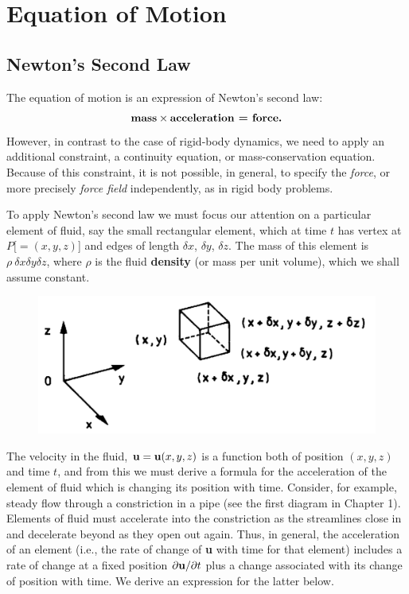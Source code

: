 \documentclass[twoside,a4paper,11pt]{report}
\begin{document}
\cleardoublepage

\chapter{Equation of Motion}
\section{Newton's Second Law}
The equation of motion is an expression of Newton's second law:
\[
\hbox{\textbf{mass}}\times \hbox{\textbf{acceleration = force.}}
\]
However, in contrast to the case of rigid-body dynamics, we need to apply an 
additional constraint, a continuity equation, or mass-conservation equation. 
Because of this constraint, it is not possible, in general, to specify the 
\textit{force}, or more precisely \textit{force field} independently, as in rigid body problems. 

To apply Newton's second law we must focus our attention on a particular 
element of fluid, say the small rectangular element, which at time $t$ has 
vertex at $P [=(x,y,z)$] and edges of length $\delta x$, $\delta y$, $\delta 
z$. The mass of this element is $\rho\ \delta x \delta y\delta z$, 
where $\rho $ is the fluid \textbf{density} (or mass per unit volume), which 
we shall assume constant.

\begin{figure}[htbp]
\centerline{\includegraphics[width=4.5in]{Section21.pdf}}
\label{fig1}
\end{figure}

The velocity in the fluid, ${\bf u} = {\bf u}(x,y,z)$ is a function both of 
position $(x,y,z)$ and time $t$, and from this we must derive a formula for the 
acceleration of the element of fluid which is changing its position with 
time. Consider, for example, steady flow through a constriction in a pipe 
(see the first diagram in Chapter 1). Elements of fluid must accelerate into 
the constriction as the streamlines close in and decelerate beyond as they 
open out again. Thus, in general, the acceleration of an element (i.e., the 
rate of change of \textbf{u} with time for that element) includes a rate of 
change at a fixed position $\partial {\bf u}/\partial t$ plus a change 
associated with its change of position with time. We derive an expression 
for the latter below.
\end{document}
